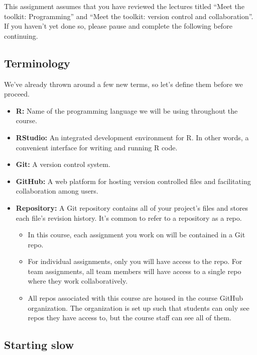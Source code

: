 \documentclass[
]{article}
\providecommand{\tightlist}{%
  \setlength{\itemsep}{0pt}\setlength{\parskip}{0pt}}
\begin{document}
This assignment assumes that you have reviewed the lectures titled
``Meet the toolkit: Programming'' and ``Meet the toolkit: version
control and collaboration''. If you haven't yet done so, please pause
and complete the following before continuing.

\subsection{Terminology}\label{terminology}

We've already thrown around a few new terms, so let's define them before
we proceed.

\begin{itemize}
\tightlist
\item
  \textbf{R:} Name of the programming language we will be using
  throughout the course.
\item
  \textbf{RStudio:} An integrated development environment for R. In
  other words, a convenient interface for writing and running R code.
\item
  \textbf{Git:} A version control system.
\item
  \textbf{GitHub:} A web platform for hosting version controlled files
  and facilitating collaboration among users.
\item
  \textbf{Repository:} A Git repository contains all of your project's
  files and stores each file's revision history. It's common to refer to
  a repository as a repo.

  \begin{itemize}
  \tightlist
  \item
    In this course, each assignment you work on will be contained in a
    Git repo.
  \item
    For individual assignments, only you will have access to the repo.
    For team assignments, all team members will have access to a single
    repo where they work collaboratively.
  \item
    All repos associated with this course are housed in the course
    GitHub organization. The organization is set up such that students
    can only see repos they have access to, but the course staff can see
    all of them.
  \end{itemize}
\end{itemize}

\subsection{Starting slow}\label{starting-slow}
\end{document}
